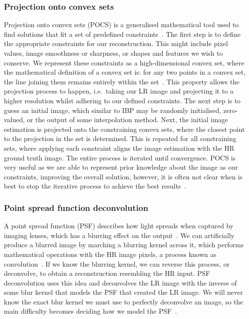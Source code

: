 \subsubsection{Projection onto convex sets}
Projection onto convex sets (POCS) is a generalised mathematical tool used to find solutions that fit a set of predefined constraints~\cite{pocs,pocsEndoscopy}. The first step is to define the appropriate constraints for our reconstruction. This might include pixel values, image smoothness or sharpness, or shapes and features we wish to conserve. We represent these constraints as a high-dimensional convex set, where the mathematical definition of a convex set is: for any two points in a convex set, the line joining them remains entirely within the set~\cite{pocsEndoscopy}. This property allows the projection process to happen, i.e.\ taking our LR image and projecting it to a higher resolution whilst adhering to our defined constraints. The next step is to guess an initial image, which similar to IBP may be randomly initialised, zero-valued, or the output of some interpolation method. Next, the initial image estimation is projected onto the constraining convex sets, where the closest point to the projection in the set is determined. This is repeated for all constraining sets, where applying each constraint aligns the image estimation with the HR ground truth image. The entire process is iterated until convergence. POCS is very useful as we are able to represent prior knowledge about the image as our constraints, improving the overall solution, however, it is often not clear when is best to stop the iterative process to achieve the best results~\cite{pocsEndoscopy}.

\subsubsection{Point spread function deconvolution}
A point spread function (PSF) describes how light spreads when captured by imaging lenses, which has a blurring effect on the output~\cite{psfDeconv}. We can artificially produce a blurred image by marching a blurring kernel across it, which performs mathematical operations with the HR image pixels, a process known as convolution~\cite{convBlur}. If we know the blurring kernel, we can reverse this process, or deconvolve, to obtain a reconstruction resembling the HR input. PSF deconvolution uses this idea and deconvolves the LR image with the inverse of some blur kernel that models the PSF that created the LR image. We will never know the exact blur kernel we must use to perfectly deconvolve an image, so the main difficulty becomes deciding how we model the PSF~\cite{pocs}.

